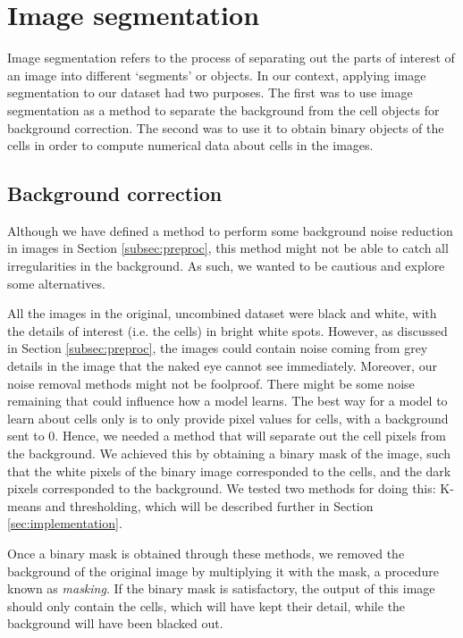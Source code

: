 \section{Image segmentation} \label{sec:segmentation}

Image segmentation refers to the process of separating out the parts of interest of an image into different `segments' or objects. In our context, applying image segmentation to our dataset had two purposes. The first was to use image segmentation as a method to separate the background from the cell objects for background correction. The second was to use it to obtain binary objects of the cells in order to compute numerical data about cells in the images. 

\subsection{Background correction} \label{subsec:correction}

Although we have defined a method to perform some background noise reduction in images in Section \ref{subsec:preproc}, this method might not be able to catch all irregularities in the background. As such, we wanted to be cautious and explore some alternatives. 

All the images in the original, uncombined dataset were black and white, with the details of interest (i.e. the cells) in bright white spots. However, as discussed in Section \ref{subsec:preproc}, the images could contain noise coming from grey details in the image that the naked eye cannot see immediately. Moreover, our noise removal methods might not be foolproof. There might be some noise remaining that could influence how a model learns. The best way for a model to learn about cells only is to only provide pixel values for cells, with a background sent to 0. Hence, we needed a method that will separate out the cell pixels from the background. We achieved this by obtaining a binary mask of the image, such that the white pixels of the binary image corresponded to the cells, and the dark pixels corresponded to the background. We tested two methods for doing this: K-means and thresholding, which will be described further in Section \ref{sec:implementation}.

Once a binary mask is obtained through these methods, we removed the background of the original image by multiplying it with the mask, a procedure known as \textit{masking}. If the binary mask is satisfactory, the output of this image should only contain the cells, which will have kept their detail, while the background will have been blacked out. 

